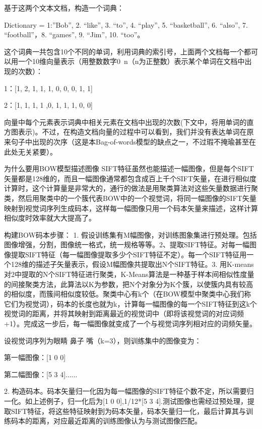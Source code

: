 \documentclass[10pt,a4paper]{ctexbook}
\begin{document}
 

基于这两个文本文档，构造一个词典：

Dictionary = {1:”Bob”, 2. “like”, 3. “to”, 4. “play”, 5. “basketball”, 6. “also”, 7. “football”，8. “games”, 9. “Jim”, 10. “too”}。

 

这个词典一共包含10个不同的单词，利用词典的索引号，上面两个文档每一个都可以用一个10维向量表示（用整数数字0~n（n为正整数）表示某个单词在文档中出现的次数）：

1：[1, 2, 1, 1, 1, 0, 0, 0, 1, 1]

2：[1, 1, 1, 1 ,0, 1, 1, 1, 0, 0]

 

向量中每个元素表示词典中相关元素在文档中出现的次数(下文中，将用单词的直方图表示)。不过，在构造文档向量的过程中可以看到，我们并没有表达单词在原来句子中出现的次序（这是本Bag-of-words模型的缺点之一，不过瑕不掩瑜甚至在此处无关紧要）。

 

为什么要用BOW模型描述图像
SIFT特征虽然也能描述一幅图像，但是每个SIFT矢量都是128维的，而且一幅图像通常都包含成百上千个SIFT矢量，在进行相似度计算时，这个计算量是非常大的，通行的做法是用聚类算法对这些矢量数据进行聚类，然后用聚类中的一个簇代表BOW中的一个视觉词，将同一幅图像的SIFT矢量映射到视觉词序列生成码本，这样每一幅图像只用一个码本矢量来描述，这样计算相似度时效率就大大提高了。

 

构建BOW码本步骤：
1. 假设训练集有M幅图像，对训练图象集进行预处理。包括图像增强，分割，图像统一格式，统一规格等等。2、提取SIFT特征。对每一幅图像提取SIFT特征（每一幅图像提取多少个SIFT特征不定）。每一个SIFT特征用一个128维的描述子矢量表示，假设M幅图像共提取出N个SIFT特征。3. 用K-means对2中提取的N个SIFT特征进行聚类，K-Means算法是一种基于样本间相似性度量的间接聚类方法，此算法以K为参数，把N个对象分为K个簇，以使簇内具有较高的相似度，而簇间相似度较低。聚类中心有k个（在BOW模型中聚类中心我们称它们为视觉词），码本的长度也就为k，计算每一幅图像的每一个SIFT特征到这k个视觉词的距离，并将其映射到距离最近的视觉词中（即将该视觉词的对应词频+1）。完成这一步后，每一幅图像就变成了一个与视觉词序列相对应的词频矢量。

 

设视觉词序列为{眼睛 鼻子 嘴}（k=3），则训练集中的图像变为：

第一幅图像：[1 0 0]

第二幅图像：[5 3 4]......

 

2. 构造码本。码本矢量归一化因为每一幅图像的SIFT特征个数不定，所以需要归一化。如上述例子，归一化后为[1 0 0],1/12*[5 3 4].测试图像也需经过预处理，提取SIFT特征，将这些特征映射到为码本矢量，码本矢量归一化，最后计算其与训练码本的距离，对应最近距离的训练图像认为与测试图像匹配。
\end{document}

